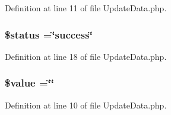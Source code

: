 Definition at line 11 of file Update\-Data.\-php.

\hypertarget{_update_data_8php_a58391ea75f2d29d5d708d7050b641c33}{
\subsubsection[{\$status}]{\setlength{\rightskip}{0pt plus 5cm}\$status =\char`\"{}success\char`\"{}}}\label{_update_data_8php_a58391ea75f2d29d5d708d7050b641c33}


Definition at line 18 of file Update\-Data.\-php.

\hypertarget{_update_data_8php_a0f298096f322952a72a50f98a74c7b60}{
\subsubsection[{\$value}]{\setlength{\rightskip}{0pt plus 5cm}\$value =\char`\"{}\char`\"{}}}\label{_update_data_8php_a0f298096f322952a72a50f98a74c7b60}


Definition at line 10 of file Update\-Data.\-php.

